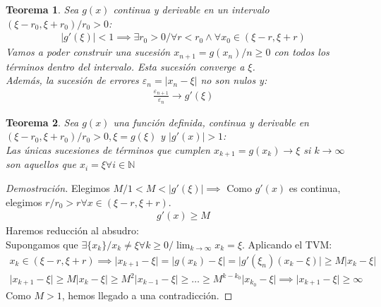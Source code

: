 \documentclass{article}
\newtheorem{theo}{Teorema}
\begin{document}
\begin{theo}
    Sea $g(x)$ continua y derivable en un intervalo $(\xi -r_{0}, \xi +r_{0}) / r_{0}> 0$:
    \begin{equation}
        \begin{split}
            \lvert g'(\xi ) \rvert < 1 \implies  \exists r_{0}>0 / \forall r< r_{0} \wedge 
            \forall x_{0} \in (\xi -r,\xi +r)
        \end{split}
    \end{equation}
    Vamos a poder construir una sucesión $x_{n+1}=g(x_{n}) / n \geq 0$ con todos los términos dentro
    del intervalo. Esta sucesión converge a $\xi $.\\
    Además, la sucesión de errores $\varepsilon _{n}= \lvert x_{n}-\xi  \rvert $ no son nulos y:
    \begin{equation}
        \begin{split}
            \frac{\varepsilon _{n+1}}{\varepsilon _{n}} \to g'(\xi )
        \end{split}
    \end{equation}
\end{theo}
\begin{theo}
    Sea $g(x)$ una función definida, continua y derivable en $(\xi -r_{0}, \xi +r_{0}) / r_{0}>0, \xi  = g(\xi )$
    y $\lvert g'(x) \rvert >1$:\\
    Las únicas sucesiones de términos que cumplen $x_{k+1}=g(x_{k}) \to \xi $ si $k \to  \infty$ son aquellos que
    $x_{i} = \xi  \forall i \in \mathbb{N}$
\end{theo}
\begin{proof}[Demostración]
    Elegimos $M / 1<M<\lvert g'(\xi ) \rvert \implies $ Como $g'(x)$ es continua, elegimos $r / r_{0}>r \forall x \in (\xi -r,\xi +r)$.
    \begin{equation}
        \begin{split}
            g'(x)\geq M
        \end{split}
    \end{equation}
    Haremos reducción al absudro:\\
    Supongamos que $\exists \{ x_{k} \} / x_{k} \neq \xi \forall k \geq 0 / \lim_{k \to \infty}x_{k} = \xi $. Aplicando
    el TVM:
    \begin{equation}
        \begin{split}
            x_{k} \in (\xi -r,\xi +r) \implies \lvert x_{k+1}-\xi  \rvert = \lvert g(x_{k})-\xi  \rvert
            = \lvert g'(\xi _{n})(x_{k}-\xi ) \rvert \geq M\lvert x_{k}-\xi  \rvert
        \end{split}
    \end{equation}
    \begin{equation}
        \begin{split}
            \lvert x_{k+1}-\xi  \rvert \geq M \lvert x_{k}-\xi  \rvert \geq M^{2}\lvert x_{k-1}-\xi \rvert \geq
            \dots \geq M^{k-k_{0}}\lvert x_{k_{0}} -\xi \rvert \implies \lvert x_{k+1}-\xi  \rvert\geq \infty  
        \end{split}
    \end{equation}
    Como $M>1$, hemos llegado a una contradicción.
\end{proof}
\end{document}
